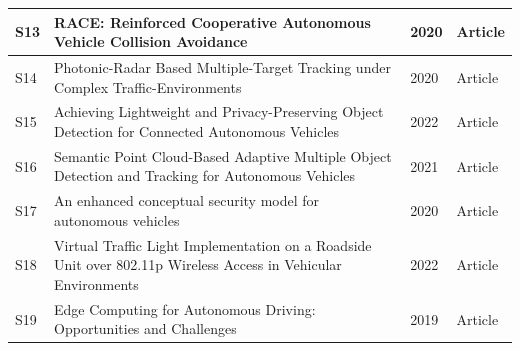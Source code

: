 \documentclass[a4paper,12pt]{article}
\begin{document}
\begin{table}[hbt!]
{\begin{tabular}{|l|l|l|l|}
S13                                                                              & RACE: Reinforced Cooperative Autonomous Vehicle Collision Avoidance                                                       & 2020                                                                              & Article                                                                           \\ \hline
S14                                                                              & Photonic-Radar Based Multiple-Target Tracking under Complex Traffic-Environments                                          & 2020                                                                              & Article                                                                           \\ \hline
S15                                                                              & Achieving Lightweight and Privacy-Preserving Object Detection for Connected Autonomous Vehicles                           & 2022                                                                              & Article                                                                           \\ \hline
S16                                                                              & Semantic Point Cloud-Based Adaptive Multiple Object Detection and Tracking for Autonomous Vehicles                        & 2021                                                                              & Article                                                                           \\ \hline
S17                                                                              & An enhanced conceptual security model for autonomous vehicles                                                             & 2020                                                                              & Article                                                                           \\ \hline
S18                                                                              & Virtual Traffic Light Implementation on a Roadside Unit over 802.11p Wireless Access in Vehicular Environments            & 2022                                                                              & Article                                                                           \\ \hline
S19                                                                              & Edge Computing for Autonomous Driving: Opportunities and Challenges                                                       & 2019                                                                              & Article                                                                           \\ \hline

\end{tabular}}
\end{table}
\end{document}
